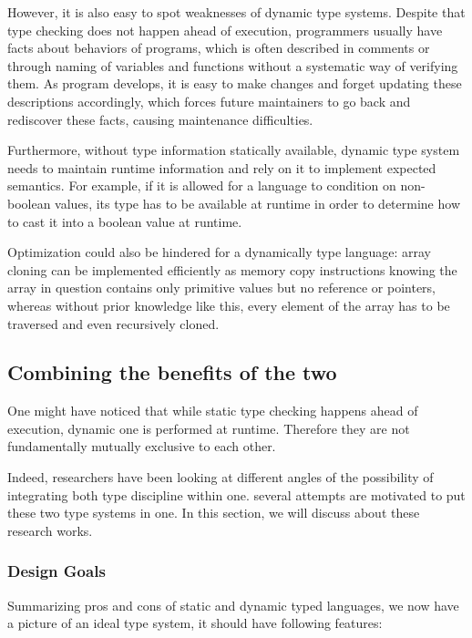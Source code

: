 However, it is also easy to spot weaknesses of dynamic type systems.
Despite that type checking does not happen ahead of execution,
programmers usually have facts about behaviors of programs,
which is often described in comments or through naming of variables and functions without a systematic way of verifying them.
As program develops, it is easy to make changes and forget updating these descriptions accordingly, which forces future maintainers to go back and rediscover these facts, causing maintenance difficulties.


Furthermore, without type information statically available,
dynamic type system needs to maintain runtime information
and rely on it to implement expected semantics.
For example, if it is allowed for a language to condition on non-boolean values,
its type has to be available at runtime in order to
determine how to cast it into a boolean value at runtime.

Optimization could also be hindered for a dynamically type language: 
array cloning can be implemented efficiently as memory copy instructions knowing the array in question contains only primitive values but no reference or pointers, whereas without prior knowledge like this, every element of the array has to be traversed and even recursively cloned.

\subsection{Combining the benefits of the two}


One might have noticed that
while static type checking happens ahead of execution,
dynamic one is performed at runtime.
Therefore they are not fundamentally mutually exclusive to each other.

Indeed, researchers have been looking at different angles of
the possibility of integrating both type discipline within one.
several attempts are motivated to put these two type systems in one.
In this section, we will discuss about these research works.

\subsubsection{Design Goals}

Summarizing pros and cons of static and dynamic typed languages,
we now have a picture of an ideal type system, it should have following features:

